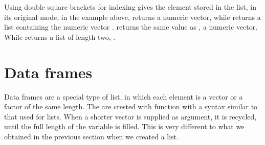 \documentclass[paper=a4,10pt,div=17,headsepline,BCOR=12mm,twoside,open=right]{scrbook}\usepackage{knitr}
\begin{document}
Using double square brackets for indexing gives the element stored in the list, in its original mode, in the example above,  returns a numeric vector, while  returns a list containing the numeric vector .  returns the same value as , a numeric vector. While  returns a list of length two, .

\section{Data frames}

Data frames are a special type of list, in which each element is a vector or a factor of the same length. The are crested with function  with a syntax similar to that used for lists. When a shorter vector is supplied as argument, it is recycled, until the full length of the variable is filled. This is very different to what we obtained in the previous section when we created a list.
\end{document}
